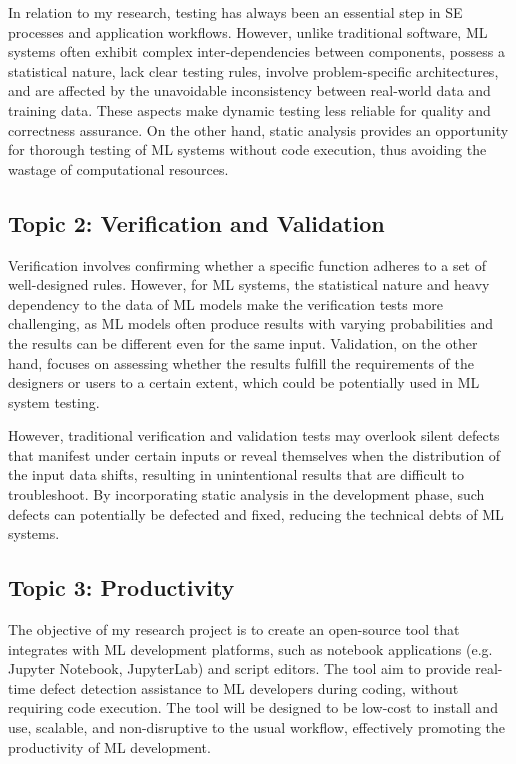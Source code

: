 \documentclass[11pt]{article}
\begin{document}
In relation to my research, testing has always been an essential step in SE processes and application workflows. However, unlike traditional software, ML systems often exhibit complex inter-dependencies between components, possess a statistical nature, lack clear testing rules, involve problem-specific architectures, and are affected by the unavoidable inconsistency between real-world data and training data. These aspects make dynamic testing less reliable for quality and correctness assurance. On the other hand, static analysis provides an opportunity for thorough testing of ML systems without code execution, thus avoiding the wastage of computational resources. 

\subsection*{ Topic 2: Verification and Validation }
Verification involves confirming whether a specific function adheres to a set of well-designed rules. However, for ML systems, the statistical nature and heavy dependency to the data of ML models make the verification tests more challenging, as ML models often produce results with varying probabilities and the results can be different even for the same input. Validation, on the other hand, focuses on assessing whether the results fulfill the requirements of the designers or users to a certain extent, which could be potentially used in ML system testing.

However, traditional verification and validation tests may overlook silent defects that manifest under certain inputs or reveal themselves when the distribution of the input data shifts, resulting in unintentional results that are difficult to troubleshoot. By incorporating static analysis in the development phase, such defects can potentially be defected and fixed, reducing the technical debts of ML systems.

\subsection*{ Topic 3: Productivity }
The objective of my research project is to create an open-source tool that integrates with ML development platforms, such as notebook applications (e.g. Jupyter Notebook, JupyterLab) and script editors. The tool aim to provide real-time defect detection assistance to ML developers during coding, without requiring code execution. The tool will be designed to be low-cost to install and use, scalable, and non-disruptive to the usual workflow, effectively promoting the productivity of ML development.
\end{document}
